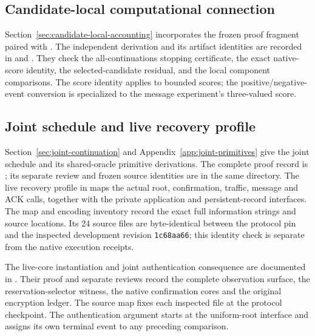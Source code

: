 \subsection{Candidate-local computational connection}

Section~\ref{sec:candidate-local-accounting} incorporates the frozen proof
fragment paired with .
The independent derivation and its artifact identities are
recorded in  and
. They check the
all-continuations stopping certificate, the exact native-score identity,
the selected-candidate residual, and the local component comparisons.
The score identity applies to bounded scores; the positive/negative-event
conversion is specialized to the message experiment's three-valued score.

\subsection{Joint schedule and live recovery profile}
\label{app:joint-artifacts}

Section~\ref{sec:joint-continuation} and Appendix~\ref{app:joint-primitives}
give the joint schedule and its shared-oracle primitive derivations.
The complete proof record is
; its separate
review and frozen source identities are in the same directory.
The live recovery profile in 
maps the actual root, confirmation, traffic, message and ACK calls, together
with the private application and persistent-record interfaces. The map and
encoding inventory record the exact full information strings and source
locations. Its 24 source files are byte-identical between the protocol pin
\sourcecommit{} and the inspected development revision
\texttt{1c68aa66}; this identity check is separate from the native
execution receipts.

The live-core instantiation and joint authentication consequence are documented
in . Their proof and separate reviews
record the complete observation surface, the reservation-selector witness,
the native confirmation cores and the original encryption ledger. The source
map fixes each inspected file at the protocol checkpoint. The authentication
argument starts at the uniform-root interface and assigns its own terminal
event to any preceding comparison.

